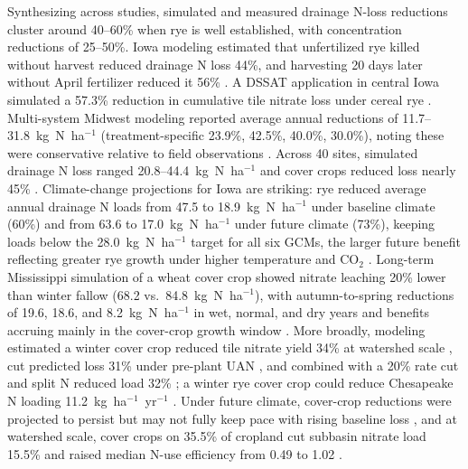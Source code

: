 Synthesizing across studies, simulated and measured drainage N-loss reductions cluster around 40--60\% when rye is well established, with concentration reductions of 25--50\%. Iowa modeling estimated that unfertilized rye killed without harvest reduced drainage N loss 44\%, and harvesting 20 days later without April fertilizer reduced it 56\% \parencite{Malone2018}. A DSSAT application in central Iowa simulated a 57.3\% reduction in cumulative tile nitrate loss under cereal rye \parencite{Chatterjee2025}. Multi-system Midwest modeling reported average annual reductions of 11.7--31.8~kg~N~ha$^{-1}$ (treatment-specific 23.9\%, 42.5\%, 40.0\%, 30.0\%), noting these were conservative relative to field observations \parencite{Malone2014b}. Across 40 sites, simulated drainage N loss ranged 20.8--44.4~kg~N~ha$^{-1}$ and cover crops reduced loss nearly 45\% \parencite{Malone2023}. Climate-change projections for Iowa are striking: rye reduced average annual drainage N loads from 47.5 to 18.9~kg~N~ha$^{-1}$ under baseline climate (60\%) and from 63.6 to 17.0~kg~N~ha$^{-1}$ under future climate (73\%), keeping loads below the 28.0~kg~N~ha$^{-1}$ target for all six GCMs, the larger future benefit reflecting greater rye growth under higher temperature and CO$_2$ \parencite{Malone2020}. Long-term Mississippi simulation of a wheat cover crop showed nitrate leaching 20\% lower than winter fallow (68.2 vs.\ 84.8~kg~N~ha$^{-1}$), with autumn-to-spring reductions of 19.6, 18.6, and 8.2~kg~N~ha$^{-1}$ in wet, normal, and dry years and benefits accruing mainly in the cover-crop growth window \parencite{Yang2021}. More broadly, modeling estimated a winter cover crop reduced tile nitrate yield 34\% at watershed scale \parencite{David2015}, cut predicted loss 31\% under pre-plant UAN \parencite{Malone2007b}, and combined with a 20\% rate cut and split N reduced load 32\% \parencite{Singh2023}; a winter rye cover crop could reduce Chesapeake N loading 11.2~kg~ha$^{-1}$~yr$^{-1}$ \parencite{Woodbury2018}. Under future climate, cover-crop reductions were projected to persist but may not fully keep pace with rising baseline loss \parencite{Gupta2023}, and at watershed scale, cover crops on 35.5\% of cropland cut subbasin nitrate load 15.5\% and raised median N-use efficiency from 0.49 to 1.02 \parencite{Makhtoumi2025}.

